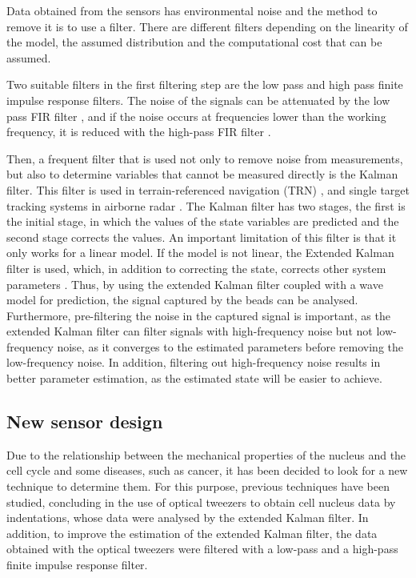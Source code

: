 \documentclass[12pt, a4paper]{article} %
\begin{document}
	Data obtained from the sensors has environmental noise and the method to remove it is to use a filter. There are different filters depending on the linearity of the model, the assumed distribution and the computational cost that can be assumed. 
	
	\setlength{\parskip}{4mm}
	
	Two suitable filters in the first filtering step are the low pass and high pass finite impulse response filters. The noise of the signals can be attenuated by the low pass FIR filter \cite{rabiner1973approximate}, and if the noise occurs at frequencies lower than the working frequency, it is reduced with the high-pass FIR filter \cite{mondal2012novel}.
	
	Then, a frequent filter that is used not only to remove noise from measurements, but also to determine variables that cannot be measured directly is the Kalman filter. This filter is used in terrain-referenced navigation (TRN) \cite{kim2018introduction}, and single target tracking systems in airborne radar \cite{pearson1974Kalman}. The Kalman filter has two stages, the first is the initial stage, in which the values of the state variables are predicted and the second stage corrects the values. An important limitation of this filter is that it only works for a linear model. If the model is not linear, the Extended Kalman filter is used, which, in addition to correcting the state, corrects other system parameters \cite{ribeiro2004Kalman}.
	\newpage
	Thus, by using the extended Kalman filter coupled with a wave model for prediction, the signal captured by the beads can be analysed. Furthermore, pre-filtering the noise in the captured signal is important, as the extended Kalman filter can filter signals with high-frequency noise but not low-frequency noise, as it converges to the estimated parameters before removing the low-frequency noise. In addition, filtering out high-frequency noise results in better parameter estimation, as the estimated state will be easier to achieve.
	
	\setlength{\parskip}{0mm}
	
	\subsection{New sensor design}
	
	Due to the relationship between the mechanical properties of the nucleus and the cell cycle and some diseases, such as cancer, it has been decided to look for a new technique to determine them. For this purpose, previous techniques have been studied, concluding in the use of optical tweezers to obtain cell nucleus data by indentations, whose data were analysed by the extended Kalman filter. In addition, to improve the estimation of the extended Kalman filter, the data obtained with the optical tweezers were filtered with a low-pass and a high-pass finite impulse response filter.
	
\end{document}
